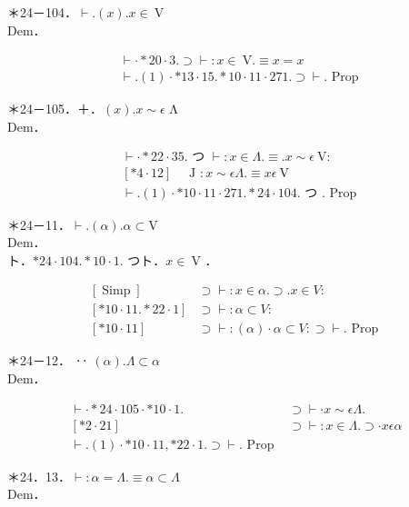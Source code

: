\documentclass[10pt]{article}
\begin{document}
＊24－104．$\vdash .(x) . x \in \mathrm{~V}$\\
Dem．


\begin{align*}
& \vdash \cdot * 20 \cdot 3 . \supset \vdash: x \in \mathrm{~V} . \equiv x=x  \tag{1}\\
& \vdash .(1) \cdot * 13 \cdot 15 . * 10 \cdot 11 \cdot 271 . \supset \vdash . \text { Prop }
\end{align*}


＊24－105．＋．$(x) . x \sim \epsilon$ Λ\\
Dem．


\begin{align*}
& \vdash \cdot * 22 \cdot 35 . \text { つ } \vdash: x \in \Lambda . \equiv . x \sim \epsilon \mathrm{~V}: \\
& {[* 4 \cdot 12] \quad \text { J }: x \sim \epsilon \Lambda . \equiv x \epsilon \mathrm{~V}}  \tag{1}\\
& \vdash .(1) \cdot * 10 \cdot 11 \cdot 271 . * 24 \cdot 104 . \text { つ } \text {. Prop }
\end{align*}


＊24－11．$\vdash .(\alpha) . \alpha \subset \mathrm{V}$\\
Dem．\\
ト．$* 24 \cdot 104 . * 10 \cdot 1$. つト．$x \in \mathrm{~V}$ ．

$$
\begin{array}{ll}
{[\operatorname{Simp}]} & \supset \vdash: x \in \alpha . \supset . x \in V: \\
{[* 10 \cdot 11 . * 22 \cdot 1]} & \supset \vdash: \alpha \subset V: \\
{[* 10 \cdot 11]} & \supset \vdash:(\alpha) \cdot \alpha \subset V: \supset \vdash . \text { Prop }
\end{array}
$$

＊24－12． ‥ $(\alpha) . \Lambda \subset \alpha$\\
Dem．

\[
\begin{array}{ll}
\vdash \cdot * 24 \cdot 105 \cdot * 10 \cdot 1 . & \supset \vdash \cdot x \sim \epsilon \Lambda . \\
{[* 2 \cdot 21]} & \supset \vdash: x \in \Lambda . \supset \cdot x \epsilon \alpha  \tag{1}\\
\vdash .(1) \cdot * 10 \cdot 11, * 22 \cdot 1 . \supset \vdash . \text { Prop }
\end{array}
\]

＊24．13．$\vdash: \alpha=\Lambda . \equiv \alpha \subset \Lambda$\\
Dem．
\end{document}
